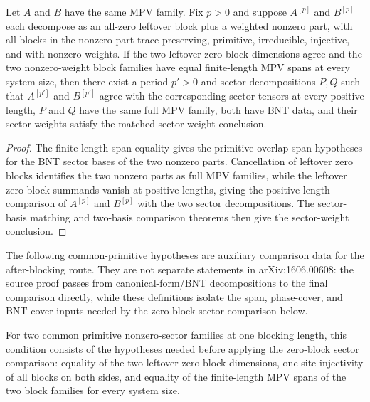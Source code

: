 \begin{theorem}%
\label{thm:afterBlocking_sectorComparison_zeroTail_of_blockSpan}
	\leanok
	Let $A$ and $B$ have the same MPV family. Fix $p>0$ and suppose $A^{[p]}$
	and $B^{[p]}$ each decompose as an all-zero leftover block plus a weighted
	nonzero part, with all blocks in the nonzero part trace-preserving,
	primitive, irreducible, injective, and with nonzero weights. If the two
	leftover zero-block dimensions agree and the two nonzero-weight block
	families have equal
	finite-length MPV spans at every system size, then there exist a period
	$p' > 0$ and sector decompositions $P,Q$ such that $A^{[p']}$ and
	$B^{[p']}$ agree with the corresponding sector tensors at every positive
	length, $P$ and $Q$ have the same full MPV family, both have BNT data, and
	their sector weights satisfy the matched sector-weight conclusion.
\end{theorem}

\begin{proof}
	\leanok
	The finite-length span equality gives the primitive overlap-span hypotheses
	for the BNT sector bases of the two nonzero parts. Cancellation of leftover
	zero blocks identifies the two nonzero parts as full MPV families, while the
	leftover zero-block summands vanish at positive lengths, giving the
	positive-length comparison of $A^{[p]}$ and $B^{[p]}$ with the two sector
	decompositions. The sector-basis matching and two-basis comparison theorems
	then give the sector-weight conclusion.
\end{proof}

The following common-primitive hypotheses are auxiliary comparison data for the
after-blocking route.  They are not separate statements in arXiv:1606.00608:
the source proof passes from canonical-form/BNT decompositions to the final
comparison directly, while these definitions isolate the span, phase-cover, and
BNT-cover inputs needed by the zero-block sector comparison below.

\begin{definition}%
\label{def:common_primitive_span_hypotheses}
	\leanok
	For two common primitive nonzero-sector families at one blocking length, this
	condition consists of the hypotheses needed before applying the
	zero-block sector comparison: equality of the two leftover zero-block
	dimensions, one-site injectivity of all blocks on both sides, and equality
	of the finite-length MPV spans of the two block families for every system
	size.
\end{definition}

